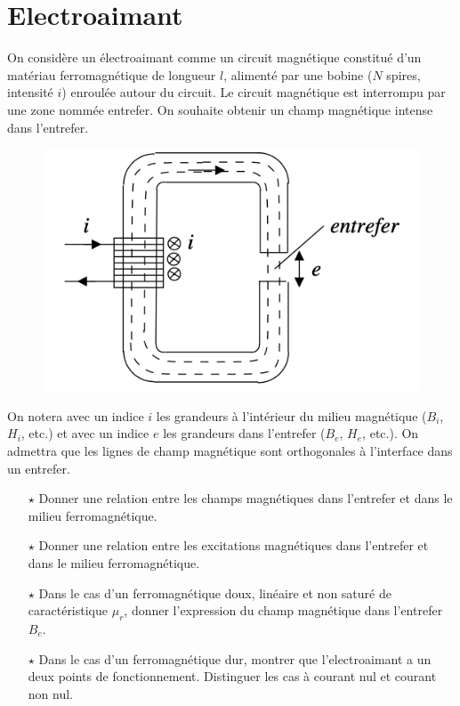 \documentclass{report}
\begin{document}
\newpage

\section*{Electroaimant}

On considère un électroaimant comme un circuit magnétique constitué d'un matériau ferromagnétique de longueur $l$, alimenté par une bobine ($N$ spires, intensité $i$) enroulée autour du circuit. Le circuit magnétique est interrompu par une zone nommée entrefer. On souhaite obtenir un champ magnétique intense dans l'entrefer. 

	\begin{figure}[h!]
	\centering
		\includegraphics[scale=0.6]{electroaimant.png}
	\end{figure}	

On notera avec un indice $i$ les grandeurs à l'intérieur du milieu magnétique ($B_i$, $H_i$, etc.) et avec un indice $e$ les grandeurs dans l'entrefer ($B_e$, $H_e$, etc.). On admettra que les lignes de champ magnétique sont orthogonales à l’interface dans un entrefer.

\begin{itemize}

	\item[$\star$] Donner une relation entre les champs magnétiques dans l'entrefer et dans le milieu ferromagnétique.
	
	\item[$\star$] Donner une relation entre les excitations magnétiques dans l'entrefer et dans le milieu ferromagnétique.
	
	\item[$\star$] Dans le cas d'un ferromagnétique doux, linéaire et non saturé de caractéristique $\mu_r$, donner l'expression du champ magnétique dans l'entrefer $B_e$.
	
	\item[$\star$] Dans le cas d'un ferromagnétique dur, montrer que l'electroaimant a un deux points de fonctionnement. Distinguer les cas à courant nul et courant non nul.

\end{itemize}
\end{document}
